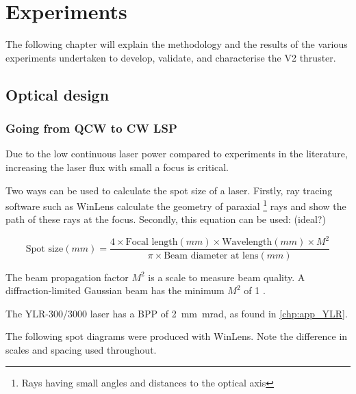 \chapter{Experiments}

    The following chapter will explain the methodology and the results of the various experiments undertaken to develop, validate, and characterise the V2 thruster.

    \section{Optical design}

        \subsection{Going from QCW to CW LSP}
                
            Due to the low continuous laser power compared to experiments in the literature, increasing the laser flux with small a focus is critical.

            Two ways can be used to calculate the spot size of a laser. Firstly, ray tracing software such as WinLens calculate the geometry of paraxial \footnote{Rays having small angles and distances to the optical axis} rays and show the path of these rays at the focus. Secondly, this equation \cite{LaserSpotSize} can be used: (ideal?)
            
            \[
            \text{Spot size}(mm) = \frac{4 \times \text{Focal length}(mm) \times \text{Wavelength}(mm) \times M^2}{\pi \times \text{Beam diameter at lens}(mm)}
            \]

            The beam propagation factor $M^2$ is a scale to measure beam quality. A diffraction-limited Gaussian beam has the minimum $M^2$ of 1 \cite{hechtUnderstandingLasersEntry2019}. 
            
            The YLR-300/3000 laser has a BPP of \qty{2}{mm.mrad}, as found in \autoref{chp:app_YLR}.

            The following spot diagrams were produced with WinLens. Note the difference in scales and spacing used throughout.



